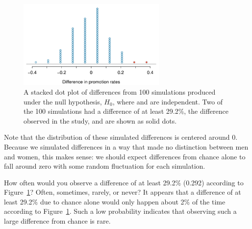 \begin{figure}[ht]
\centering
\includegraphics[width=0.65\textwidth]{05/figures/discRandDotPlot/discRandDotPlot}
\caption{A stacked dot plot of differences from 100 simulations produced under the null hypothesis, $H_0$, where  and  are independent. Two of the 100 simulations had a difference of at least 29.2\%, the difference observed in the study, and are shown as solid dots.}
\label{discRandDotPlot}
\end{figure}

Note that the distribution of these simulated differences is centered around 0. Because we simulated differences in a way that made no distinction between men and women, this makes sense: we should expect differences from chance alone to fall around zero with some random fluctuation for each simulation.

\begin{example}{How often would you observe a difference of at least 29.2\% (0.292) according to Figure~\ref{discRandDotPlot}? Often, sometimes, rarely, or never?}
It appears that a difference of at least 29.2\% due to chance alone would only happen about 2\% of the time according to Figure~\ref{discRandDotPlot}. Such a low probability indicates that observing such a large difference from chance is rare.
\end{example}

